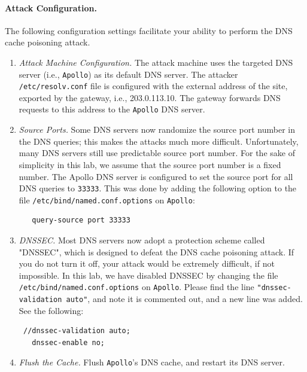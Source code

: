 \paragraph{Attack Configuration.} The following configuration settings
facilitate your ability to perform the DNS cache poisoning attack. 

\begin{enumerate}

\item {\em Attack Machine Configuration.} 
The attack machine uses the targeted 
DNS server (i.e., {\tt Apollo}) as its default DNS server. 
The attacker {\tt /etc/resolv.conf} file is configured with the external
address of the site, exported by the gateway, i.e., 203.0.113.10.
The gateway forwards DNS requests to this address to the {\tt Apollo} DNS server.

\item {\em Source Ports.} Some DNS servers now randomize the source port number 
in the DNS queries; this makes the attacks much more difficult. Unfortunately, 
many DNS servers still use predictable source port number.  
For the sake of simplicity in this lab, we assume that the source port 
number is a fixed number. The Apollo DNS server is configured to set
the source port for all DNS queries 
to {\tt 33333}. This was done by adding the following option to the file {\tt /etc/bind/named.conf.options}
on {\tt Apollo}:
\begin{verbatim}
   query-source port 33333
\end{verbatim}

\item {\em DNSSEC.}
Most DNS servers now adopt a protection scheme called "DNSSEC", which is
designed to defeat the DNS cache poisoning attack.  If you do not turn
it off, your attack would be extremely difficult, if not impossible.
In this lab, we have disabled DNSSEC by changing 
the file {\tt /etc/bind/named.conf.options} on {\tt Apollo}. Please find the line 
{\tt "dnssec-validation auto"}, and note it is commented out, and a new line was added. See
the following:
\begin{verbatim}
 //dnssec-validation auto;
   dnssec-enable no;
\end{verbatim}


\item {\em Flush the Cache.}
Flush {\tt Apollo}'s  DNS cache, and restart its DNS server. 


\end{enumerate}


